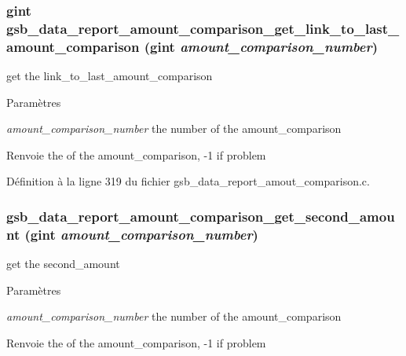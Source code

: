 \subsubsection[{gsb\_\-data\_\-report\_\-amount\_\-comparison\_\-get\_\-link\_\-to\_\-last\_\-amount\_\-comparison}]{\setlength{\rightskip}{0pt plus 5cm}gint gsb\_\-data\_\-report\_\-amount\_\-comparison\_\-get\_\-link\_\-to\_\-last\_\-amount\_\-comparison (gint {\em amount\_\-comparison\_\-number})}\label{gsb__data__report__amout__comparison_8h_a0917d321c4f62f197d4d31ea0fdcc6a4}
get the link\_\-to\_\-last\_\-amount\_\-comparison


\begin{DoxyParams}{Paramètres}
\item[{\em amount\_\-comparison\_\-number}]the number of the amount\_\-comparison\end{DoxyParams}
\begin{DoxyReturn}{Renvoie}
the of the amount\_\-comparison, -\/1 if problem 
\end{DoxyReturn}


Définition à la ligne 319 du fichier gsb\_\-data\_\-report\_\-amout\_\-comparison.c.

\subsubsection[{gsb\_\-data\_\-report\_\-amount\_\-comparison\_\-get\_\-second\_\-amount}]{ gsb\_\-data\_\-report\_\-amount\_\-comparison\_\-get\_\-second\_\-amount (gint {\em amount\_\-comparison\_\-number})}\label{gsb__data__report__amout__comparison_8h_aa34007389fb6e92a19ef95edc1803d8b}
get the second\_\-amount


\begin{DoxyParams}{Paramètres}
\item[{\em amount\_\-comparison\_\-number}]the number of the amount\_\-comparison\end{DoxyParams}
\begin{DoxyReturn}{Renvoie}
the of the amount\_\-comparison, -\/1 if problem 
\end{DoxyReturn}



